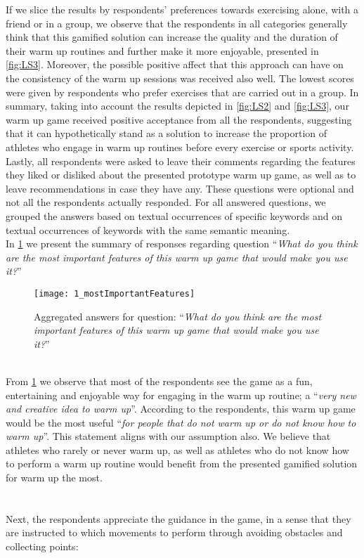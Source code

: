 If we slice the results by respondents' preferences towards exercising alone, with a friend or in a group, we observe that the respondents in all categories generally think that this gamified solution can increase the quality and the duration of their warm up routines and further make it more enjoyable, presented in \ref{fig:LS3}. Moreover, the possible positive affect that this approach can have on the consistency of the warm up sessions was received also well. The lowest scores were given by respondents who prefer exercises that are carried out in a group. In summary, taking into account the results depicted in \ref{fig:LS2} and \ref{fig:LS3}, our warm up game received positive acceptance from all the respondents, suggesting that it can hypothetically stand as a solution to increase the proportion of athletes who engage in warm up routines before every exercise or sports activity.\\ Lastly, all respondents were asked to leave their comments regarding the features they liked or disliked about the presented prototype warm up game, as well as to leave recommendations in case they have any. These questions were optional and not all the respondents actually responded. For all answered questions, we grouped the answers based on textual occurrences of specific keywords and on textual occurrences of keywords with the same semantic meaning.\\ In \ref{fig:1_mostImportantFeatures} we present the summary of responses regarding question ``\textit{What do you think are the most important features of this warm up game that would make you use it?}''\\
\begin{figure}[h]
    \centering
    \texttt{[image: 1\_mostImportantFeatures]}
    \caption{Aggregated answers for question: ``\textit{What do you think are the most important features of this warm up game that would make you use it?}''}
    \label{fig:1_mostImportantFeatures}
\end{figure}\\ 
From \ref{fig:1_mostImportantFeatures} we observe that most of the respondents see the game as a fun, entertaining and enjoyable way for engaging in the warm up routine; a ``\textit{very new and creative idea to warm up}''. According to the respondents, this warm up game would be the most useful ``\textit{for people that do not warm up or do not know how to warm up}''. This statement aligns with our assumption also. We believe that athletes who rarely or never warm up, as well as athletes who do not know how to perform a warm up routine would benefit from the presented gamified solution for warm up the most.\\\\\\ Next, the respondents appreciate the guidance in the game, in a sense that they are instructed to which movements to perform through avoiding obstacles and collecting points:
